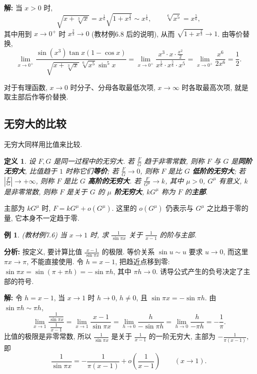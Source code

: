 \documentclass[UTF8,openany]{ctexbook}
\theoremstyle{chinesetextbook}
\newtheorem{definition}{定义}[section]
\newtheorem{example}{例}[section]
\newenvironment{cnsolution}{\par\indent\textbf{解:} \ignorespaces}{\par}
\begin{document}
\begin{cnsolution}
当 $x>0$ 时,
\[
\sqrt{x+\sqrt[3]x}=x^{\frac16}\sqrt{1+x^{\frac23}}\sim x^{\frac16},\qquad\sqrt[6]{x^5}=x^{\frac56},
\]
其中用到 $x\to0^+$ 时 $x^{\frac23}\to0$ (教材例6.8 后的说明), 从而 $\sqrt{1+x^{\frac23}}\to1$. 由等价替换,
\[
\lim_{x\to0^+}\frac{\sin(x^3)\tan x(1-\cos x)}{\sqrt{x+\sqrt[3]x}\,\sqrt[6]{x^5}\sin^5x}=\lim_{x\to0^+}\frac{x^3\cdot x\cdot\frac{x^2}2}{x^{\frac16}\cdot x^{\frac56}\cdot x^5}=\lim_{x\to0^+}\frac{x^6}{2x^6}=\frac12.
\]
\end{cnsolution}
对于有理函数, $x\to0$ 时分子、分母各取最低次项, $x\to\infty$ 时各取最高次项, 就是取主部后作等价替换.
\subsection{无穷大的比较}
无穷大同样用比值来比较.
\begin{definition}
设 $F,G$ 是同一过程中的无穷大. 若 $\displaystyle\frac FG$ 趋于非零常数, 则称 $F$ 与 $G$ 是\textbf{同阶无穷大}, 比值趋于 $1$ 时称它们\textbf{等价}; 若 $\displaystyle\frac FG\to0$, 则称 $F$ 是比 $G$ \textbf{低阶的无穷大}; 若 $\displaystyle\left|\frac FG\right|\to+\infty$, 则称 $F$ 是比 $G$ \textbf{高阶的无穷大}. 若 $\displaystyle\frac F{G^\mu}\to k$, 其中 $\mu>0$, $G^\mu$ 有意义, $k$ 是非零常数, 则称 $F$ 是关于 $G$ 的 \textbf{$\mu$ 阶无穷大}, $kG^\mu$ 称为 $F$ 的\textbf{主部}.
\end{definition}
主部为 $kG^\mu$ 时, $F=kG^\mu+o(G^\mu)$. 这里的 $o(G^\mu)$ 仍表示与 $G^\mu$ 之比趋于零的量, 它本身不一定趋于零.
\begin{example}
\textnormal{(教材例7.6)} 当 $x\to1$ 时, 求 $\displaystyle\frac1{\sin\pi x}$ 关于 $\displaystyle\frac1{x-1}$ 的阶与主部.
\end{example}
\par\indent\textbf{分析:} 按定义, 要计算比值 $\displaystyle\frac{x-1}{\sin\pi x}$ 的极限. 等价关系 $\sin u\sim u$ 要求 $u\to0$, 而这里 $\pi x\to\pi$, 不能直接使用. 令 $h=x-1$, 把趋近点移到零: $\sin\pi x=\sin(\pi+\pi h)=-\sin\pi h$, 其中 $\pi h\to0$. 诱导公式产生的负号决定了主部的符号.
\begin{cnsolution}
令 $h=x-1$, 当 $x\to1$ 时 $h\to0$, $h\ne0$, 且 $\sin\pi x=-\sin\pi h$. 由 $\sin\pi h\sim\pi h$,
\[
\lim_{x\to1}\frac{\frac1{\sin\pi x}}{\frac1{x-1}}=\lim_{x\to1}\frac{x-1}{\sin\pi x}=\lim_{h\to0}\frac h{-\sin\pi h}=\lim_{h\to0}\frac h{-\pi h}=-\frac1\pi.
\]
比值的极限是非零常数, 所以 $\displaystyle\frac1{\sin\pi x}$ 是关于 $\displaystyle\frac1{x-1}$ 的一阶无穷大, 主部为 $\displaystyle-\frac1{\pi(x-1)}$, 即
\[
\frac1{\sin\pi x}=-\frac1{\pi(x-1)}+o\!\left(\frac1{x-1}\right)\qquad(x\to1).
\]
\end{cnsolution}
\end{document}

